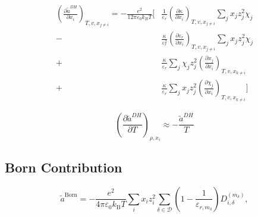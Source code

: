 \documentclass[12pt, letterpaper]{article}
\begin{document}
\begin{equation}
    \begin{aligned}
        \left(\frac{\partial \tilde{a}^{DH}}{\partial x_{i}}\right)_{T,v,x_{j\neq i}}
        =
        -\frac{e^{2}}{12\pi\varepsilon_{0}k_{B}T}
        \Bigg[
          & \frac{1}{\varepsilon_{r}}\left(\frac{\partial\kappa}{\partial x_{i}}\right)_{T,v,x_{j\neq i}}
            \sum_{j}x_{j}z_{j}^{2}\chi_{j}
        \\
        - & \frac{\kappa}{\varepsilon_{r}^{2}}
            \left(\frac{\partial\varepsilon_{r}}{\partial x_{i}}\right)_{T,v,x_{j\neq i}}
            \sum_{j}x_{j}z_{j}^{2}\chi_{j}
        \\
        + & \frac{\kappa}{\varepsilon_{r}}
            \sum_{j}\chi_{j}z_{j}^{2}
            \left(\frac{\partial x_{j}}{\partial x_{i}}\right)_{T,v,x_{k\neq i}}
        \\
        + & \frac{\kappa}{\varepsilon_{r}}
            \sum_{j}x_{j}z_{j}^{2}
            \left(\frac{\partial\chi_{j}}{\partial x_{i}}\right)_{T,v,x_{k\neq i}}
            \Bigg]
    \end{aligned}
    \label{eq:dh_ares_dxi}
\end{equation}


\begin{equation}
    \left(\frac{\partial \tilde{a}^{DH}}{\partial T}\right)_{\rho,x_i}
    \approx
    -\frac{\tilde{a}^{DH}}{T}
    \label{eq:dh_ares_dT}
\end{equation}


\subsection{Born Contribution}


\begin{equation}
\tilde{a}^{\mathrm{Born}}
=
-\frac{e^2}{4\pi\varepsilon_0 k_{\mathrm{B}} T}
\sum_i x_i z_i^2
\sum_{\delta \in \mathcal{D}}
\left(
1-\frac{1}{\varepsilon_{r,m_\delta}}
\right)
D_{i,\delta}^{(m_\delta)},
\label{eq:ares_born_modular}
\end{equation}
\end{document}
